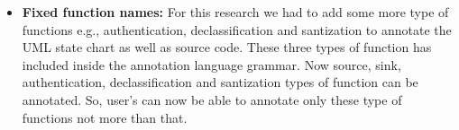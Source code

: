 \begin{itemize}
	\item \textbf{Fixed function names:} For this research we had to add some more type of functions e.g., authentication, declassification and santization to annotate the UML state chart as well as source code. These three types of function has included inside the annotation language grammar. Now source, sink, authentication, declassification and santization types of function can be annotated. So, user's can now be able to annotate only these type of functions not more than that.
	
\end{itemize}